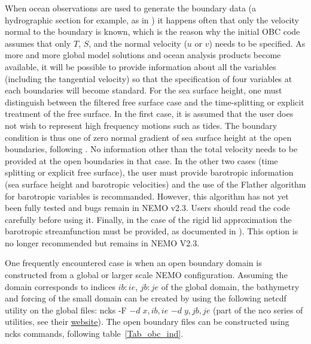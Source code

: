 When ocean observations are used to generate the boundary data (a hydrographic 
section for example, as in \citet{Treguier_al_JGR01}) it happens often that only the velocity 
normal to the boundary is known, which is the reason why the initial OBC code 
assumes that only $T$, $S$, and the normal velocity ($u$ or $v$) needs to be 
specified. As more and more global model solutions and ocean analysis products 
become available, it will be possible to provide information about all the variables 
(including the tangential velocity) so that the specification of four variables at each 
boundaries will become standard. For the sea surface height, one must distinguish 
between the filtered free surface case and the time-splitting or explicit treatment of 
the free surface.
 In the first case, it is assumed that the user does not wish to represent high 
 frequency motions such as tides. The boundary condition is thus one of zero 
 normal gradient of sea surface height at the open boundaries, following \citet{Marchesiello2001}. 
No information other than the total velocity needs to be provided at the open 
boundaries in that case. In the other two cases (time splitting or explicit free surface), 
the user must provide barotropic information (sea surface height and barotropic 
velocities) and the use of the Flather algorithm for barotropic variables is 
recommanded. However, this algorithm has not yet been fully tested and bugs 
remain in NEMO v2.3. Users should read the code carefully before using it. Finally, 
in the case of the rigid lid approximation the barotropic streamfunction must be 
provided, as documented in \citet{Treguier_al_JGR01}). This option is no longer 
recommended but remains in NEMO V2.3.

One frequently encountered case is when an open boundary domain is constructed 
from a global or larger scale NEMO configuration. Assuming the domain corresponds 
to indices $ib:ie$, $jb:je$ of the global domain, the bathymetry and forcing of the 
small domain can be created by using the following netcdf utility on the global files: 
ncks -F $-d\;x,ib,ie$ $-d\;y,jb,je$ (part of the nco series of utilities, 
see their \href{http://nco.sourceforge.net}{website}). 
The open boundary files can be constructed using ncks 
commands, following table~\ref{Tab_obc_ind}. 

